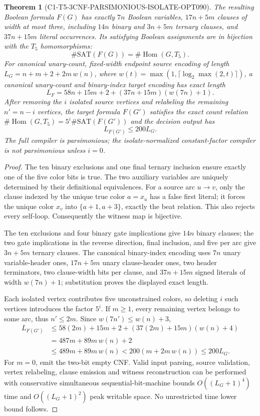 \documentclass[11pt]{article}
\newtheorem{theorem}{Theorem}
\begin{document}
\begin{theorem}[C1-T5-3CNF-PARSIMONIOUS-ISOLATE-OPT090]
The resulting Boolean formula $F(G)$ has exactly $7n$ Boolean
variables, $17n+5m$ clauses of width at most three,
including $14n$ binary and $3n+5m$ ternary clauses,
and $37n+15m$ literal occurrences. Its satisfying Boolean
assignments are in \emph{bijection} with the $T_5$ homomorphisms:
\[
\boxed{\#\mathrm{SAT}(F(G))=\#\operatorname{Hom}(G,T_5).}
\]
For canonical unary-count, fixed-width endpoint source encoding
of length $L_G=n+m+2+2m\,w(n)$, where
$w(t)=\max(1,\lceil\log_2\max(2,t)\rceil)$,
a canonical unary-count and binary-index target encoding has
exact length
\[
L_F=58n+15m+2+(37n+15m)(w(7n)+1).
\]
After removing the $i$ isolated source vertices and relabeling
the remaining $n'=n-i$ vertices, the target formula $F(G')$
satisfies the exact count relation
$\#\operatorname{Hom}(G,T_5)=5^i\#\mathrm{SAT}(F(G'))$
and the \emph{decision} output has
\[
\boxed{L_{F(G')}\le 200L_G}.
\]
The full compiler is parsimonious; the isolate-normalized
constant-factor compiler is not parsimonious unless $i=0$.
\end{theorem}
\begin{proof}
The ten binary exclusions and one final ternary inclusion
ensure exactly one of the five color bits is true. The two
auxiliary variables are uniquely determined by their
definitional equivalences. For a source arc $u\to v$,
only the clause indexed by the unique true color $a=x_u$
has a false first literal; it forces the unique color
$x_v$ into $\{a+1,a+3\}$, exactly the beat relation.
This also rejects every self-loop. Consequently the witness
map is bijective.

The ten exclusions and four binary gate implications
give $14n$ binary clauses; the two gate implications
in the reverse direction, final inclusion, and five
per arc give $3n+5m$ ternary clauses.
The canonical binary-index encoding uses
$7n$ unary variable-header ones, $17n+5m$
unary clause-header ones, two header terminators,
two clause-width bits per clause, and
$37n+15m$ signed literals of width $w(7n)+1$;
substitution proves the displayed exact length.

Each isolated vertex contributes five unconstrained colors,
so deleting $i$ such vertices introduces the factor $5^i$.
If $m\ge1$, every remaining vertex belongs to some arc,
thus $n'\le2m$. Since $w(7n')\le w(n)+3$,
\[
\begin{aligned}
L_{F(G')}&\le 58(2m)+15m+2+
 (37(2m)+15m)(w(n)+4)\\
 &=487m+89m\,w(n)+2\\
 &\le489m+89m\,w(n)
 <200(m+2m\,w(n))\le200L_G.
\end{aligned}
\]
For $m=0$, emit the two-bit empty CNF. Valid input
parsing, source validation, vertex relabeling, clause
emission and witness reconstruction can be performed
with conservative simultaneous sequential-bit-machine
bounds $O((L_G+1)^4)$ time and
$O((L_G+1)^2)$ peak writable space. No unrestricted
time lower bound follows.
\end{proof}
\end{document}
